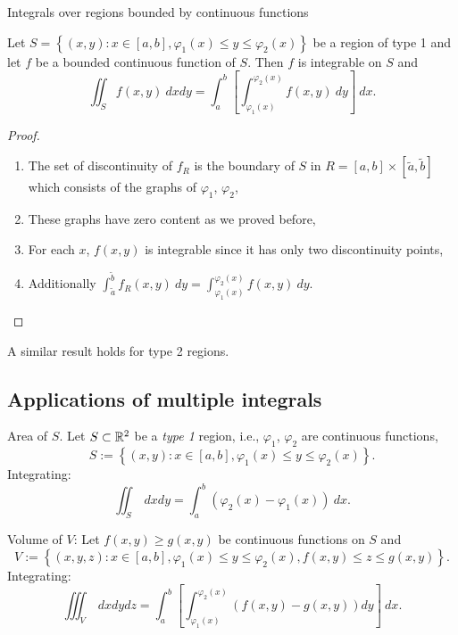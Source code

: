 {Integrals over regions bounded by continuous functions}

\begin{theorem}
    Let \(S = \left\{(x,y): x \in [a,b], \varphi_1(x) \leq y \leq \varphi_2(x)\right\}\) be a region of type 1 and let \(f\) be a bounded continuous function of \(S\).
    Then \(f\) is integrable on \(S\) and
    \[
        \iint_{S} f(x,y) \ dxdy = \int_{a}^{b} \left[\int_{\varphi_1(x)}^{\varphi_2(x)} f(x,y) \ dy\right] \ dx.
    \]
\end{theorem}

\begin{proof}
    \begin{enumerate}
        \item The set of discontinuity of \(f_{R}\) is the boundary of \(S\) in \(R=[a,b]\times[\tilde a,\tilde b]\) which consists of the graphs of \(\varphi_1\), \(\varphi_2\),
        \item These graphs have zero content as we proved before,
        \item For each \(x\), \(f(x,y)\) is integrable since it has only two discontinuity points,
        \item Additionally \(\int_{\tilde a}^{\tilde b} f_{R}(x,y) \ dy =  \int_{\varphi_1(x)}^{\varphi_2(x)} f(x,y) \ dy \). \qedhere
    \end{enumerate}
\end{proof}

A similar result holds for type 2 regions.

\subsection{Applications of multiple integrals}


Area of \(S\).
Let    \(S \subset \mathbb{R}^2\)  be a \emph{type 1} region, i.e.,   \(\varphi_1\), \(\varphi_2\) are continuous functions,
\[
    S := \left\{(x,y): x \in [a,b], \varphi_1(x) \leq y \leq \varphi_2(x)\right\}.
\]
Integrating:
\[
    \iint_{S} \ dx dy = \int_{a}^{b}( \varphi_2(x) - \varphi_1(x)) \ dx.
\]


Volume of \(V\):
Let \(f(x,y) \geq g(x,y)\) be continuous functions on \(S\) and
\[
    V := \left\{ (x,y,z) :  x \in [a,b], \varphi_1(x) \leq y \leq \varphi_2(x), f(x,y) \leq z \leq g(x,y)  \right\}.
\]
Integrating:
\[
    \iiint_{V} \ dxdydz =  \int_{a}^{b}
    \left[ \int_{\varphi_1(x)}^{\varphi_2(x)}   ( f(x,y)  -  g(x,y)) dy \right] \ dx.
\]




